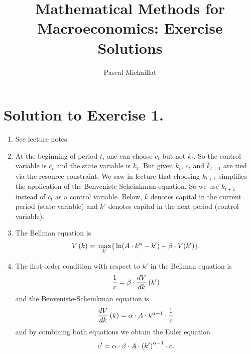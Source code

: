 \documentclass[letterpaper,12pt,leqno]{article}
\begin{document}
\title{Mathematical Methods for Macroeconomics: Exercise Solutions}
\author{Pascal Michaillat}
\date{}

\begin{titlepage}
\maketitle
\end{titlepage}

\section*{Solution to Exercise 1.}

\begin{enumerate}
\item See lecture notes.
\item At the beginning of period $t$, one can choose $c_{t}$ but not $k_{t}$. So the control variable is $c_{t}$ and the state variable is $k_{t}$. But given $k_{t}$, $c_{t}$ and $k_{t+1}$ are tied via the resource constraint. We saw in lecture that choosing $k_{t+1}$ simplifies the application of the Benveniste-Scheinkman equation. So we use $k_{t+1}$ instead of $c_{t}$ as a control variable.  Below, $k$ denotes capital in the current period (state variable) and $k'$ denotes capital in the next period (control variable).
\item The Bellman equation is 
\begin{align*}
V\bp{k} =\max[k']{\ln{A\cdot k^{\a}-k'} +\b\cdot V(k')}.
\end{align*}
\item The first-order condition with respect to $k'$ in the Bellman equation is
\begin{align}
\frac{1}{c} =\beta \cdot \frac{d V}{d k}\left( k' \right)\label{eq:EQ1}
\end{align}
and the Benveniste-Scheinkman equation is
\begin{align*}
\frac{d V}{d k}\left( k \right) =\alpha\cdot  A\cdot k^{\alpha -1}\cdot \frac{1}{c} 
\end{align*}
and by combining both equations we obtain the Euler equation
\begin{align*}
c' =\alpha \cdot \beta \cdot A\cdot \left( k' \right)^{\alpha -1}\cdot c .
\end{align*}


\end{enumerate}
\end{document}
